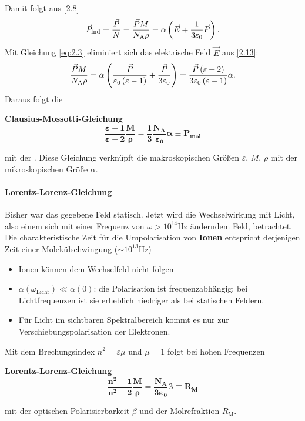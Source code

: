     Damit folgt aus \ref{2.8}
    \begin{equation}
    	\label{2.13}
    	\vec{P}_{\text{ind}} = \frac{\vec{P}}{N} = \frac{\vec{P} M}{N_\mathrm{A} \rho} = \alpha \left( \vec{E} + \frac{1}{3 \varepsilon_0} \vec{P} \right) .
    \end{equation} 
    Mit Gleichung \eqref{eq:2.3} eliminiert sich das elektrische Feld $ \vec{E}$ aus \ref{2.13}:
    $$
    \frac{\vec{P} M}{N_\mathrm{A} \rho} = \alpha \left( \frac{\vec{P}}{ \varepsilon_0 \left( \varepsilon -1 \right) } + \frac{\vec{P}}{3 \varepsilon_0} \right)  = \frac{\vec{P} \left( \varepsilon +2 \right) }{3 \varepsilon_0 \left( \varepsilon-1 \right) } \alpha.
    $$
    Daraus folgt die 
    \begin{important}
        \textbf{Clausius-Mossotti-Gleichung}\\
        \begin{equation}
            \bm{ \frac{ \varepsilon -1}{ \varepsilon +2} \frac{M}{ \rho} = \frac{1}{3} \frac{\text{N}_{\text{A}}}{ \varepsilon_0} \alpha \equiv P_{\text{mol}}}
            \label{eq:clausius_mossotti}
        \end{equation}
    \end{important}
    mit der . Diese Gleichung verknüpft die makroskopischen Größen $ \varepsilon$, $ M$, $ \rho$ mit der mikroskopischen Größe $ \alpha$.

\paragraph{Lorentz-Lorenz-Gleichung}
    Bisher war das gegebene Feld statisch. Jetzt wird die Wechselwirkung mit Licht, also einem sich mit einer Frequenz von $ \omega > \si{10^{14} \hertz}$ änderndem Feld, betrachtet. Die charakteristische Zeit für die Umpolarisation von \textbf{Ionen} entspricht derjenigen Zeit einer Molekülschwingung ($\sim \si{10^{13}\hertz}$)
    \begin{itemize}[label= $\to$]
    	\item Ionen können dem Wechselfeld nicht folgen
    	\item $ \alpha \left( \omega_{\text{Licht}} \right) \ll \alpha \left( 0 \right)$: die Polarisation ist frequenzabhängig; bei Lichtfrequenzen ist sie erheblich niedriger als bei statischen Feldern.
    	\item Für Licht im sichtbaren Spektralbereich kommt es nur zur Verschiebungspolarisation der Elektronen.
    \end{itemize}
    Mit dem Brechungsindex $n^2 = \varepsilon \mu$ und $ \mu = 1$ folgt bei hohen Frequenzen 
    \begin{important}
        \textbf{Lorentz-Lorenz-Gleichung}\\
        \begin{equation}
            \bm{\frac{n^2 -1}{n^2 +2} \frac{M}{ \rho} = \frac{\text{N}_{\text{A}}}{3 \varepsilon_0} \beta \equiv R_{\text{M}}}
        \end{equation}
    \end{important}
    mit der optischen Polarisierbarkeit $\beta$ und der Molrefraktion $R_{\text{M}}$.

